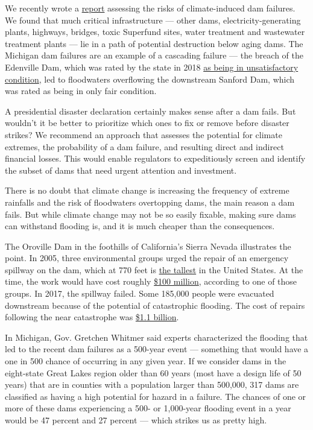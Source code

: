 We recently wrote a
\href{http://water.columbia.edu/files/2020/05/GRI_Report.pdf}{report}
assessing the risks of climate-induced dam failures. We found that much
critical infrastructure --- other dams, electricity-generating plants,
highways, bridges, toxic Superfund sites, water treatment and wastewater
treatment plants --- lie in a path of potential destruction below aging
dams. The Michigan dam failures are an example of a cascading failure
--- the breach of the Edenville Dam, which was rated by the state in
2018
\href{https://www.nytimes.com/aponline/2020/05/20/us/ap-us-midwest-flooding.html}{as
being in unsatisfactory condition}, led to floodwaters overflowing the
downstream Sanford Dam, which was rated as being in only fair condition.

A presidential disaster declaration certainly makes sense after a dam
fails. But wouldn't it be better to prioritize which ones to fix or
remove before disaster strikes? We recommend an approach that assesses
the potential for climate extremes, the probability of a dam failure,
and resulting direct and indirect financial losses. This would enable
regulators to expeditiously screen and identify the subset of dams that
need urgent attention and investment.

There is no doubt that climate change is increasing the frequency of
extreme rainfalls and the risk of floodwaters overtopping dams, the main
reason a dam fails. But while climate change may not be so easily
fixable, making sure dams can withstand flooding is, and it is much
cheaper than the consequences.

The Oroville Dam in the foothills of California's Sierra Nevada
illustrates the point. In 2005, three environmental groups urged the
repair of an emergency spillway on the dam, which at 770 feet is
\href{https://www.worldatlas.com/articles/tallest-dams-in-the-united-states.html}{the
tallest} in the United States. At the time, the work would have cost
roughly
\href{https://www.washingtonpost.com/news/post-nation/wp/2017/02/13/officials-were-warned-the-oroville-dam-emergency-spillway-wasnt-safe-they-didnt-listen/}{\$100
million}, according to one of those groups. In 2017, the spillway
failed. Some 185,000 people were evacuated downstream because of the
potential of catastrophic flooding. The cost of repairs following the
near catastrophe was
\href{https://www.latimes.com/local/california/la-me-oroville-cost-20180905-story.html}{\$1.1
billion}.

In Michigan, Gov. Gretchen Whitmer said experts characterized the
flooding that led to the recent dam failures as a 500-year event ---
something that would have a one in 500 chance of occurring in any given
year. If we consider dams in the eight-state Great Lakes region older
than 60 years (most have a design life of 50 years) that are in counties
with a population larger than 500,000, 317 dams are classified as having
a high potential for hazard in a failure. The chances of one or more of
these dams experiencing a 500- or 1,000-year flooding event in a year
would be 47 percent and 27 percent --- which strikes us as pretty high.


